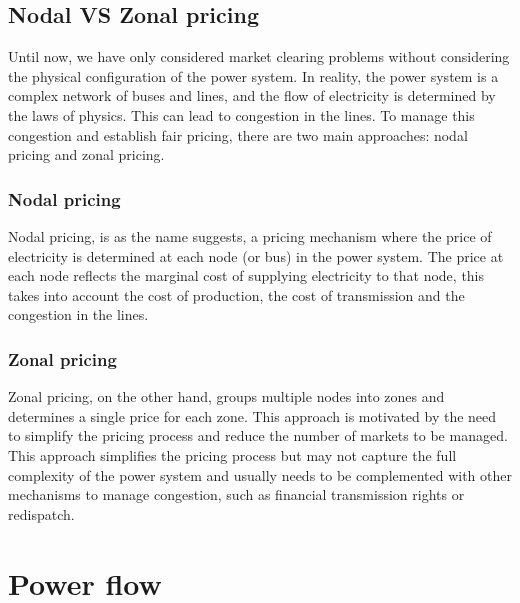 \documentclass[12pt, openany]{report}
\theoremstyle{definition}
\begin{document}
\section{Nodal VS Zonal pricing}
Until now, we have only considered market clearing problems without considering the physical configuration of the power system. In reality, the power system is a complex network of buses and lines, and the flow of electricity is determined by the laws of physics. This can lead to congestion in the lines. To manage this congestion and establish fair pricing, there are two main approaches: nodal pricing and zonal pricing.
\subsection{Nodal pricing}
Nodal pricing, is as the name suggests, a pricing mechanism where the price of electricity is determined at each node (or bus) in the power system. The price at each node reflects the marginal cost of supplying electricity to that node, this takes into account the cost of production, the cost of transmission and the congestion in the lines.
\subsection{Zonal pricing}
Zonal pricing, on the other hand, groups multiple nodes into zones and determines a single price for each zone. This approach is motivated by the need to simplify the pricing process and reduce the number of markets to be managed. This approach simplifies the pricing process but may not capture the full complexity of the power system and usually needs to be complemented with other mechanisms to manage congestion, such as financial transmission rights or redispatch.
\chapter{Power flow}
\end{document}
